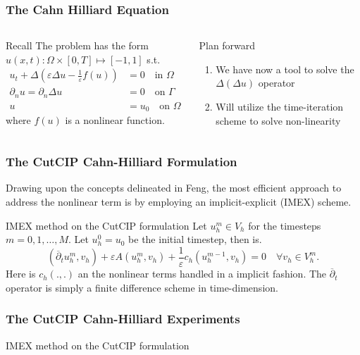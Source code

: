 \begin{frame}
\frametitle{The Cahn Hilliard Equation}
    \begin{columns}
        \begin{column}{0.5\textwidth}
            \begin{block}{Recall}
                The problem has the form $u( x, t): \Omega \times [0,T] \mapsto [-1,1]$ s.t.
                \[
                \begin{split}
                    u_t+\Delta\left(\varepsilon \Delta u-\frac{1}{\varepsilon} f(u)\right)&=0 \quad \text{in } \Omega \\
                    \partial_n u=\partial_n \Delta u& =0 \quad \text{on } \Gamma  \\
                    u & =u_0 \quad \text{on } \Omega
                \end{split}
                \]
                where $f(u)$ is a nonlinear function.
            \end{block}
        \end{column}
        \begin{column}{0.5\textwidth}
            \begin{block}{Plan forward}
                \begin{enumerate}
                    \item We have now a tool to solve the $\Delta ( \Delta u) $ operator
                    \item Will utilize the time-iteration scheme to solve non-linearity
                \end{enumerate}
            \end{block}
        \end{column}
    \end{columns}
\end{frame}


\begin{frame}
\frametitle{The CutCIP Cahn-Hilliard Formulation}


Drawing upon the concepts delineated in Feng\footnotemark[1], the most efficient approach to address the nonlinear term is by employing an implicit-explicit (IMEX) scheme.

\begin{block}{IMEX method on the CutCIP formulation}
    Let $u^{m}_{h} \in V_{h}$ for the timesteps $m=0,1,\ldots,M$. Let $u_{h}^{0} = u_{0}$ be the initial timestep, then is.
\[
(\overline{\partial}  _{t} u_{h}^m, v_h ) + \varepsilon A (u_{h}^{m}, v_h )+\frac{1}{\varepsilon} c_h ( u_{h}^{m-1}, v_h)=0 \quad \forall v_h \in V_h^m .
\]
Here is $c_{h}( . , .) $ an the nonlinear terms handled in a implicit fashion. The $ \overline{\partial}  _{t}$ operator is simply a finite difference scheme in time-dimension.

\end{block}

\end{frame}

\begin{frame}
\frametitle{The CutCIP Cahn-Hilliard Experiments}

\begin{block}{IMEX method on the CutCIP formulation}
\end{block}

\end{frame}

